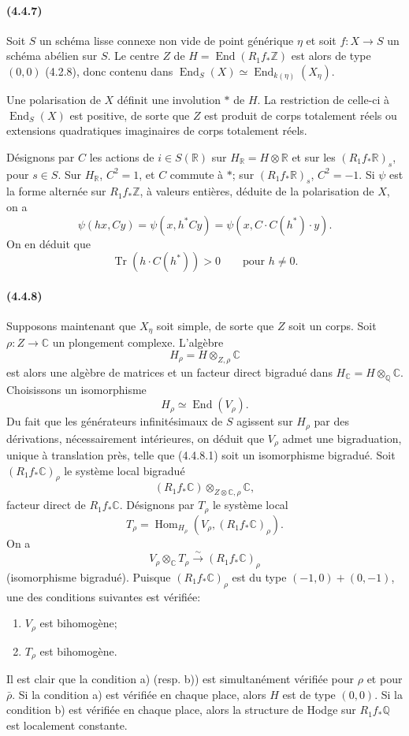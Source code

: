 \documentclass[10pt]{article}
\newcommand{\C}{\mathbb C}
\newcommand{\Q}{\mathbb Q}
\newcommand{\Z}{\mathbb Z}
\newcommand{\Hom}{\operatorname{Hom}}
\newcommand{\iso}{\xrightarrow{\sim}}
\newcommand{\R}{\mathbb R}
\providecommand{\End}{\operatorname{End}}
\newcommand{\Tr}{\operatorname{Tr}}
\begin{document}
\paragraph{(4.4.7)} Soit $S$ un schéma lisse connexe non vide de point générique $\eta$ et soit $f:X\to S$ un schéma abélien sur $S$. Le centre $Z$ de $H=\End(R_1f_*\Z)$ est alors de type $(0,0)$ (4.2.8), donc contenu dans $\End_S(X)\simeq \End_{k(\eta)}(X_\eta)$.

Une polarisation de $X$ définit une involution $*$ de $H$. La restriction de celle-ci à $\End_S(X)$ est positive, de sorte que $Z$ est produit de corps totalement réels ou extensions quadratiques imaginaires de corps totalement réels.

Désignons par $C$ les actions de $i\in S(\R)$ sur $H_\R=H\otimes\R$ et sur les $(R_1f_*\R)_s$, pour $s\in S$. Sur $H_\R$, $C^2=1$, et $C$ commute à $*$; sur $(R_1f_*\R)_s$, $C^2=-1$. Si $\psi$ est la forme alternée sur $R_1f_*\Z$, à valeurs entières, déduite de la polarisation de $X$, on a
\[
\psi(hx,Cy)=\psi(x,h^*Cy)=\psi(x,C\cdot C(h^*)\cdot y).
\]
On en déduit que
\[
\tag{4.4.7.1}
\Tr(h\cdot C(h^*))>0\qquad\text{pour }h\ne0.
\]

\paragraph{(4.4.8)} Supposons maintenant que $X_\eta$ soit simple, de sorte que $Z$ soit un corps. Soit $\rho:Z\to\C$ un plongement complexe. L'algèbre
\[
H_\rho=H\otimes_{Z,\rho}\C
\]
est alors une algèbre de matrices et un facteur direct bigradué dans $H_\C=H\otimes_\Q\C$. Choisissons un isomorphisme
\[
\tag{4.4.8.1}
H_\rho\simeq\End(V_\rho).
\]
Du fait que les générateurs infinitésimaux de $S$ agissent sur $H_\rho$ par des dérivations, nécessairement intérieures, on déduit que $V_\rho$ admet une bigraduation, unique à translation près, telle que (4.4.8.1) soit un isomorphisme bigradué. Soit $(R_1f_*\C)_\rho$ le système local bigradué
\[
(R_1f_*\C)\otimes_{Z\otimes\C,\rho}\C,
\]
facteur direct de $R_1f_*\C$. Désignons par $T_\rho$ le système local
\[
T_\rho=\Hom_{H_\rho}(V_\rho,(R_1f_*\C)_\rho).
\]
On a
\[
\tag{4.4.8.2}
V_\rho\otimes_\C T_\rho\iso (R_1f_*\C)_\rho
\]
(isomorphisme bigradué). Puisque $(R_1f_*\C)_\rho$ est du type $(-1,0)+(0,-1)$, une des conditions suivantes est vérifiée:
\begin{enumerate}[label=\alph*)]
\item $V_\rho$ est bihomogène;
\item $T_\rho$ est bihomogène.
\end{enumerate}
Il est clair que la condition a) (resp. b)) est simultanément vérifiée pour $\rho$ et pour $\bar\rho$. Si la condition a) est vérifiée en chaque place, alors $H$ est de type $(0,0)$. Si la condition b) est vérifiée en chaque place, alors la structure de Hodge sur $R_1f_*\Q$ est localement constante.
\end{document}
